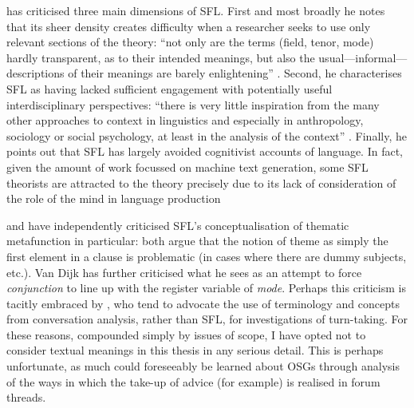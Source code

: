 		 \textcite{van_dijk_text_2004} has criticised three main dimensions of SFL. First and most broadly he notes that its sheer density creates difficulty when a researcher seeks to use only relevant sections of the theory:  ``not only are the terms (field, tenor, mode) hardly transparent, as to their intended meanings, but also the usual---informal---descriptions of their meanings are barely enlightening'' \citeyear[p.~341]{van_dijk_text_2004}. Second, he characterises SFL as having lacked sufficient engagement with potentially useful interdisciplinary perspectives: ``there is very little inspiration from the many other approaches to context in linguistics and especially in anthropology, sociology or social psychology, at least in the analysis of the context'' \citeyear[p.~342]{van_dijk_text_2004}. Finally, he points out that SFL has largely avoided cognitivist accounts of language. In fact, given the amount of work focussed on machine text generation, some SFL theorists are attracted to the theory precisely due to its lack of consideration of the role of the mind in language production \cite{odonnell_[sys-func]_2014}


		 \textcite{huddleston_constituency_1988}  and \textcite{widdowson_text_2008} have independently criticised SFL's conceptualisation of thematic metafunction in particular:  both argue that the notion of theme as simply the first element in a clause is problematic (in cases where there are dummy subjects, etc.). Van Dijk has further criticised what he sees as an attempt to force  \emph{conjunction} to line up with the register variable of \emph{mode}. Perhaps this criticism is tacitly embraced by \textcite{eggins_analysing_2004}, who tend to advocate the use of terminology and concepts from conversation analysis, rather than SFL, for investigations of turn-taking.  For these reasons, compounded simply by issues of scope, I have opted not to consider textual meanings in this thesis in any serious detail. This is perhaps unfortunate, as much could foreseeably be learned about OSGs through analysis of the ways in which the take-up of advice (for example) is realised in forum threads.

